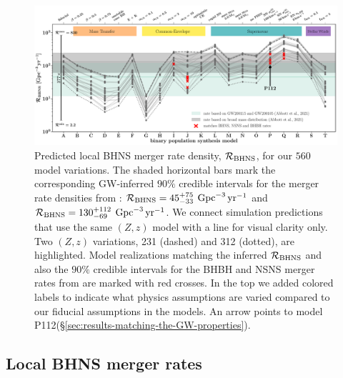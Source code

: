 \documentclass{aastex63}
\newcommand{\SFRD}{\text{SFRD}\ensuremath{(Z,z)}\xspace}
\newcommand{\Rbhns}{\ensuremath{\mathcal{R}_{\rm{BHNS}}}\xspace}
\newcommand{\Nmodels}{\ensuremath{560}\xspace}
\newcommand{\Gpcyr}{\ensuremath{\,\rm{Gpc}^{-3}\,\rm{yr}^{-1}}\xspace}
\newcommand{\model}{P112\xspace}
\begin{document}
\begin{figure}
    \centering
\includegraphics[width=1.0\textwidth]{figures/Rates_intrinsic_single_panel.pdf} 
    \caption{Predicted local \ac{BHNS} merger rate density, \Rbhns, for our \Nmodels model variations.
    The shaded horizontal bars mark the corresponding \ac{GW}-inferred $90\%$ credible intervals for the merger rate densities from \citet[][]{Abbott:2021-first-NSBH}: $\Rbhns = {45}_{-33}^{+75}$\Gpcyr and  $\Rbhns = {130}_{-69}^{+112}$\Gpcyr. 
    We connect simulation predictions that use the same \SFRD model with a line for visual clarity only. Two \SFRD variations, 231 (dashed) and 312 (dotted),  are highlighted.
    Model realizations matching the inferred \Rbhns and also the $90\%$ credible intervals for the \ac{BHBH} and \ac{NSNS} merger rates from \citet[][]{GWTC2:pop} are marked with red crosses.
    In the top we added colored labels to indicate what physics assumptions are varied compared to our fiducial assumptions in the models. An arrow points to model \model (\S\ref{sec:results-matching-the-GW-properties}).
    }
    \label{fig:Rates-Intrinsic}
\end{figure}


\subsection{Local BHNS merger rates}
\label{sec:results-intrinsic-merger-rates}
\end{document}
